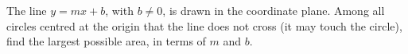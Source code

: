 The line $y=mx+b$, with $b\ne0$, is drawn in the coordinate plane. Among all circles centred at the origin that the line does not cross (it may touch the circle), find the largest possible area, in terms of $m$ and $b$.
